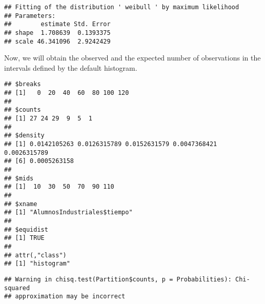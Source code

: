 \documentclass[
]{article}
\newenvironment{Shaded}{\begin{snugshade}}{\end{snugshade}}
\newcommand{\AttributeTok}[1]{\textcolor[rgb]{0.13,0.29,0.53}{#1}}
\newcommand{\ConstantTok}[1]{\textcolor[rgb]{0.56,0.35,0.01}{#1}}
\newcommand{\DecValTok}[1]{\textcolor[rgb]{0.00,0.00,0.81}{#1}}
\newcommand{\FunctionTok}[1]{\textcolor[rgb]{0.13,0.29,0.53}{\textbf{#1}}}
\newcommand{\NormalTok}[1]{#1}
\newcommand{\OtherTok}[1]{\textcolor[rgb]{0.56,0.35,0.01}{#1}}
\newcommand{\SpecialCharTok}[1]{\textcolor[rgb]{0.81,0.36,0.00}{\textbf{#1}}}
\begin{document}
\begin{verbatim}
## Fitting of the distribution ' weibull ' by maximum likelihood 
## Parameters:
##        estimate Std. Error
## shape  1.708639  0.1393375
## scale 46.341096  2.9242429
\end{verbatim}

Now, we will obtain the observed and the expected number of observations
in the intervals defined by the default histogram.

\begin{Shaded}
\end{Shaded}

\begin{verbatim}
## $breaks
## [1]   0  20  40  60  80 100 120
## 
## $counts
## [1] 27 24 29  9  5  1
## 
## $density
## [1] 0.0142105263 0.0126315789 0.0152631579 0.0047368421 0.0026315789
## [6] 0.0005263158
## 
## $mids
## [1]  10  30  50  70  90 110
## 
## $xname
## [1] "AlumnosIndustriales$tiempo"
## 
## $equidist
## [1] TRUE
## 
## attr(,"class")
## [1] "histogram"
\end{verbatim}

\begin{Shaded}
\end{Shaded}

\begin{verbatim}
## Warning in chisq.test(Partition$counts, p = Probabilities): Chi-squared
## approximation may be incorrect
\end{verbatim}
\end{document}
